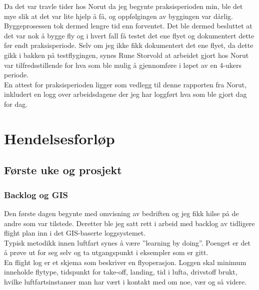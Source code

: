 \documentclass[12pt, a4paper]{report}
\begin{document}
Da det var travle tider hos Norut da jeg begynte praksisperioden min, ble det mye slik at det var lite hjelp å få, og oppfølgingen av byggingen var dårlig. Byggeprosessen tok dermed lengre tid enn forventet. Det ble dermed besluttet at det var nok å bygge fly og i hvert fall få testet det ene flyet og dokumentert dette før endt praksisperiode. Selv om jeg ikke fikk dokumentert det ene flyet, da dette gikk i bakken på testflygingen, synes Rune Storvold at arbeidet gjort hos Norut var tilfredsstillende for hva som ble mulig å gjennomføre i løpet av en 4-ukers periode.\\


En attest for praksisperioden ligger som vedlegg til denne rapporten fra Norut, inkludert en logg over arbeidsdagene der jeg har loggført hva som ble gjort dag for dag.


\newpage
\section{Hendelsesforløp}
\subsection{Første uke og prosjekt}
\subsubsection{Backlog og GIS}
Den første dagen begynte med omvisning av bedriften og jeg fikk hilse på de andre som var tilstede. Deretter ble jeg satt rett i arbeid med backlog av tidligere flight plan inn i det GIS-baserte loggsystemet. \\
Typisk metodikk innen luftfart synes å være ''learning by doing''. Poenget er det å prøve ut for seg selv og ta utgangspunkt i eksempler som er gitt.\\
En flight log er et skjema som beskriver en flyoperasjon. Loggen skal minimum inneholde flytype, tidspunkt for take-off, landing, tid i lufta, drivstoff brukt, hvilke luftfartsinstanser man har vært i kontakt med om noe, vær og så videre. 
\end{document}
